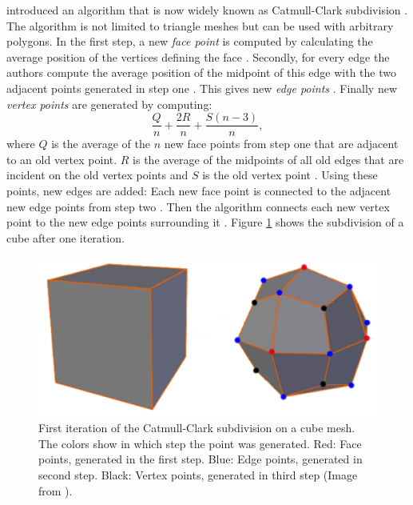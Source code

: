 \citeauthor{CATMULL1978350} introduced an algorithm that is now widely known as Catmull-Clark subdivision \cite{CATMULL1978350}.
The algorithm is not limited to triangle meshes but can be used with arbitrary polygons.
In the first step, a new \textit{face point} is computed by calculating the average position of the vertices defining the face \cite{CATMULL1978350}.
Secondly, for every edge the authors compute the average position of the midpoint of this edge with the two adjacent points generated in step one \cite{CATMULL1978350}.
This gives new \textit{edge points} \cite{CATMULL1978350}.
Finally new \textit{vertex points} are generated by computing:
\begin{equation*}
	\frac{Q}{n} + \frac{2R}{n} + \frac{S(n-3)}{n},
\end{equation*}
where $Q$ is the average of the $n$ new face points from step one that are adjacent to an old vertex point.
$R$ is the average of the midpoints of all old edges that are incident on the old vertex points and $S$ is the old vertex point \cite{CATMULL1978350}.
Using these points, new edges are added: Each new face point is connected to the adjacent new edge points from step two \cite{CATMULL1978350}.
Then the algorithm connects each new vertex point to the new edge points surrounding it \cite{CATMULL1978350}.
Figure \ref{fig:catmull_clark_subdivision} shows the subdivision of a cube after one iteration.
\begin{figure}[ht]
    \centering
    \includegraphics[width=0.5\linewidth]{img/catmull_clark_subdivision.png}
    \caption[First iteration of the Catmull-Clark subdivision]{First iteration of the Catmull-Clark subdivision on a cube mesh. The colors show in which step the point was generated. Red: Face points, generated in the first step. Blue: Edge points, generated in second step. Black: Vertex points, generated in third step (Image from \cite{cheng_catmull_clark_visualization}).}
    \label{fig:catmull_clark_subdivision}
\end{figure}

